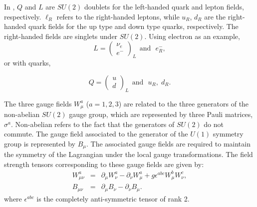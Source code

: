 In \eqn{\ref{eq:LagrangianEW}}, $Q$ and $L$ are $SU(2)$ doublets for the left-handed quark and lepton fields, respectively. $\ell_{R}$ refers to
the right-handed leptons, while $u_{R}$, $d_{R}$ are the right-handed quark fields for the up type and down type quarks, respectively. 
The right-handed fields are singlets under $SU(2)$. Using electron as an example, 
\begin{equation}
L = \left( \begin{array}{c}\nu_{e} \\ e^{-}\end{array}\right)_{L}  \:\:  \text{and} \:\:\:  e^{-}_{R},
\end{equation}
or with quarks,

\begin{equation}
Q = \left( \begin{array}{c}u \\ d\end{array}\right)_{L}  \:\:  \text{and} \:\:\:  u_{R},\;d_{R}.
\end{equation}

The three gauge fields $W_{\mu}^{a}$ ($a=1,2,3$) are related to the three generators of the non-abelian $SU(2)$ gauge group, which are represented
by three Pauli matrices, 
$\sigma^{a}$. Non-abelian refers to the fact that the generators of $SU(2)$ do not commute. The gauge field associated to the generator of the 
$U(1)$ symmetry group is represented by $B_{\mu}$. The associated gauge fields are required to maintain the symmetry of the Lagrangian under the 
local gauge transformations. The field strength tensors corresponding to these gauge fields are given by:
\begin{eqnarray}
W_{\mu\nu}^{a} & = & \partial_{\mu}W_{\nu}^{a} - \partial_{\nu}W_{\mu}^{a} + g\epsilon^{abc} W_{\mu}^{b}W_{\nu}^{c}, \\
B_{\mu\nu} & = & \partial_{\mu}B_{\nu} - \partial_{\nu}B_{\mu}.
\end{eqnarray}
where $\epsilon^{abc}$ is the completely anti-symmetric tensor of rank 2. 

